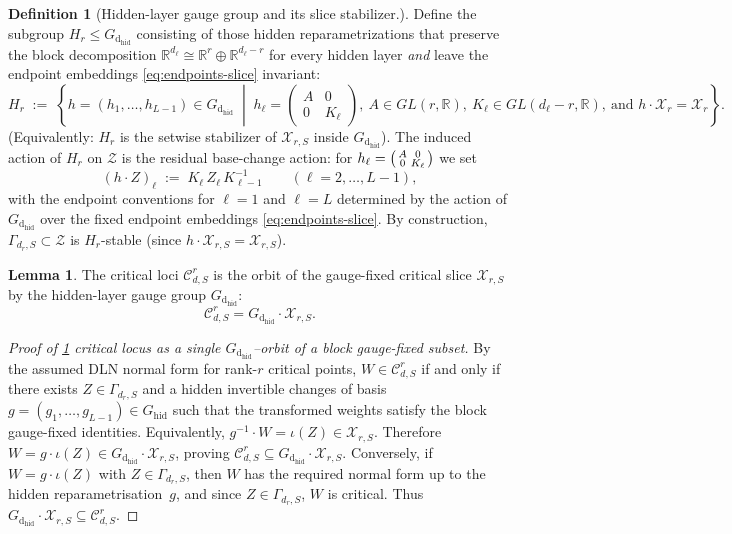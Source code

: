 \documentclass{article}
\newcommand{\hid}{\operatorname{hid}}
\newcommand{\dhid}{\operatorname{d_{hid}}}
\newcommand{\R}{\mathbb{R}}
\theoremstyle{definition}
\newtheorem{lemma}[theorem]{Lemma}
\newtheorem{definition}[theorem]{Definition}
\begin{document}
\begin{definition}[Hidden-layer gauge group and its slice stabilizer.]
Define the subgroup $H_{r}\le G_{\dhid}$ consisting of those hidden reparametrizations that preserve the block decomposition
$\R^{d_\ell}\cong \R^r\oplus \R^{d_\ell-r}$ for every hidden layer \emph{and} leave the endpoint embeddings
\eqref{eq:endpoints-slice} invariant:
\begin{equation}\label{eq:Hrsigma-def}
H_{r}
\;:=\;
\left\{
h=(h_1,\dots,h_{L-1})\in G_{\dhid} \;\middle|\;
h_\ell=
\begin{pmatrix}
A & 0\\
0 & K_\ell
\end{pmatrix},
\ A\in GL(r,\R),\ K_\ell\in GL(d_\ell-r,\R),
\ \text{and } h\cdot \mathcal X_r =\mathcal X_r
\right\}.
\end{equation}
(Equivalently: $H_{r}$ is the setwise stabilizer of $\mathcal X_{r,S}$ inside $G_{\dhid}$).
\noindent
The induced action of $H_{r}$ on $\mathcal Z$ is the residual base-change action:
for $h_\ell=\begin{psmallmatrix}A&0\\0&K_\ell\end{psmallmatrix}$ we set
\begin{equation}\label{eq:Hrsigma-on-Z}
(h\cdot Z)_\ell \;:=\; K_\ell\, Z_\ell\, K_{\ell-1}^{-1}
\qquad (\ell=2,\dots,L-1),
\end{equation}
with the endpoint conventions for $\ell=1$ and $\ell=L$ determined by the action of $G_{\dhid}$ over the fixed endpoint embeddings
\eqref{eq:endpoints-slice}.
By construction, $\Gamma_{d_r,S }\subset \mathcal Z$ is $H_{r}$-stable (since
$h\cdot \mathcal X_{r,S}=\mathcal X_{r,S}$).
\end{definition}
\noindent
\begin{lemma}\label{prop:orbit-saturation}
The critical loci $\mathcal{C}^r_{d,S}$ is the orbit of the gauge-fixed critical slice $\mathcal{X}_{r,S}$ by the hidden-layer gauge group $G_{\dhid}$:
\begin{equation}\label{eq:orbit-saturation}
\mathcal{C}^r_{d,S} = G_{\dhid} \cdot \mathcal{X}_{r,S}.
\end{equation}
\end{lemma}
\noindent
\begin{proof}[Proof of \ref{prop:orbit-saturation} critical locus as a single $G_{\dhid}$--orbit of a block gauge-fixed subset]\label{proof:orbit-saturation}
    By the assumed DLN normal form for rank-$r$ critical points, $W \in \mathcal{C}^r_{d,S}$ if and only if there exists $Z \in \Gamma_{d_r,S}$ and a hidden invertible changes of basis $g = (g_1, \dots, g_{L-1}) \in G_{\hid}$ such that the transformed weights satisfy the block gauge-fixed identities.  Equivalently, $g^{-1} \cdot W = \iota(Z) \in \mathcal{X}_{r,S}$.  Therefore $W = g \cdot \iota(Z) \in G_{\dhid} \cdot \mathcal{X}_{r,S}$, proving $\mathcal{C}^r_{d,S} \subseteq G_{\dhid} \cdot \mathcal{X}_{r,S}$.  Conversely, if $W = g \cdot \iota(Z)$ with $Z \in \Gamma_{d_r,S}$, then $W$ has the required normal form up to the hidden reparametrisation~$g$, and since $Z\in \Gamma_{d_r,S}$, $W$ is critical.  Thus $G_{\dhid} \cdot \mathcal{X}_{r,S} \subseteq \mathcal{C}^r_{d,S}$.
\end{proof}
\end{document}
